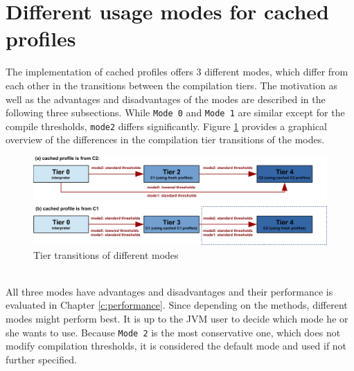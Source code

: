 \section{Different usage modes for cached profiles}
\label{s:cacheprofilesmode}
The implementation of cached profiles offers 3 different modes, which differ from each other in the transitions between the compilation tiers.
The motivation as well as the advantages and disadvantages of the modes are described in the following three subsections.
While \texttt{Mode 0} and \texttt{Mode 1} are similar except for the compile thresholds, \texttt{mode2} differs significantly.
Figure \ref{f:hs_tiers_thresholds} provides a graphical overview of the differences in the compilation tier transitions of the modes.
\begin{figure}[h]
  \begin{center}
    \centering
    \includegraphics{figures/hs_tiers_threshold.png}
    \caption{Tier transitions of different modes}
    \label{f:hs_tiers_thresholds}
  \end{center}
\end{figure}\\
All three modes have advantages and disadvantages and their performance is evaluated in Chapter \ref{c:performance}. Since depending on the methods, different modes might perform best. It is up to the JVM user to decide which mode he or she wants to use. Because \texttt{Mode 2} is the most conservative one, which does not modify compilation thresholds, it is considered the default mode and used if not further specified.

